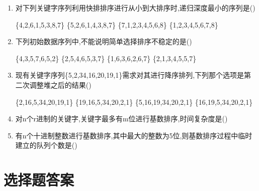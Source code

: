 \documentclass[12pt, a4paper, oneside, UTF8]{ctexbook}
\begin{document}
\begin{enumerate}
    \item 对下列关键字序列利用快排排序进行从小到大排序时,递归深度最小的序列是(\qquad)
    \begin{choices}[2]
        \task \{4,2,6,1,5,3,8,7\} \task \{5,2,6,1,4,3,8,7\}
        \task \{7,1,2,3,4,5,6,8\} \task \{1,2,3,4,5,6,7,8\}
    \end{choices}

    \item 下列初始数据序列中,不能说明简单选择排序不稳定的是(\qquad)
    \begin{choices}[2]
        \task \{4,3,5,7,6,5,2\} \task \{2,5,4,6,5,3,7\}
        \task \{1,6,3,6,2,6,7\} \task \{2,1,3,4,5,5,7\}
    \end{choices}

    \item 现有关键字序列\{5,2,34,16,20,19,1\}需求对其进行降序排列,下列那个选项是第二次调整堆之后的结果(\qquad)
    \begin{choices}[2]
        \task \{2,16,5,34,20,19,1\} \task \{19,16,5,34,20,2,1\}
        \task \{5,16,19,34,20,2,1\} \task \{16,19,5,34,20,2,1\}
    \end{choices}


    \item 对n个r进制的关键字,关键字最多有m位进行基数排序,时间复杂度是(\qquad)
    \item 有n个十进制整数进行基数排序,其中最大的整数为5位,则基数排序过程中临时建立的队列个数是(\qquad)
\end{enumerate}

\newpage

\section{选择题答案}
\end{document}
